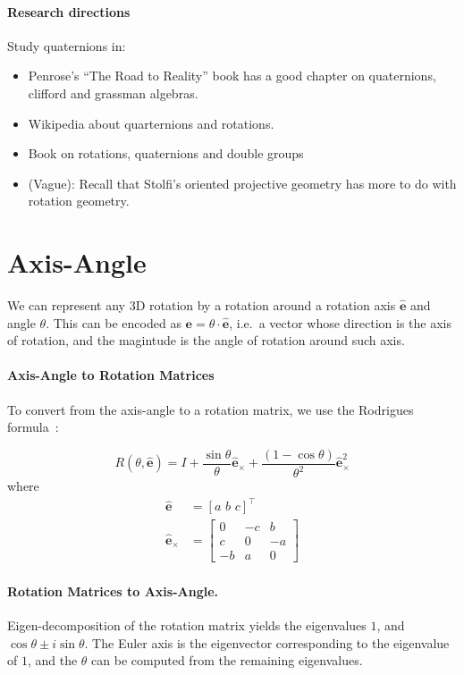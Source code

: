 \paragraph{Research directions}
Study quaternions in:
\begin{itemize}
\item Penrose's ``The Road to Reality'' book has a good chapter on quaternions,
clifford and grassman algebras.
\item Wikipedia about quarternions and rotations.
\item Book on rotations, quaternions and double groups
\item (Vague): Recall that Stolfi's oriented projective geometry has more to do with
rotation geometry.
\end{itemize}

\section{Axis-Angle}

We can represent any 3D rotation by a rotation around a rotation axis
$\hat{\mathbf e}$ and angle $\theta$. This can be encoded as $\mathbf e =
\theta\cdot\hat{\mathbf e}$, i.e.\ a vector whose direction is the axis of
rotation, and the magintude is the angle of rotation around such axis.

\paragraph{Axis-Angle to Rotation Matrices}

To convert from the axis-angle to a rotation matrix, we use the Rodrigues
formula~\cite{Ma:Soatto:etal:book}:

\begin{equation}\label{eq:rodrigues:rotation:formula}
R(\theta,\hat{\mathbf e}) = I + \frac{\sin\theta}{\theta} \hat{\mathbf e}_\times
+ \frac{(1 - \cos\theta)}{\theta^2}\hat{\mathbf e}_\times^2
\end{equation}
where
\begin{align}
\hat{\mathbf e} &= 
\left[ a\,\,b\,\,c \right]^\top\\
\hat{\mathbf e}_\times&= \left[\begin{array}{ccc} 0 & -c & b\\ c & 0 & -a\\ -b &
a & 0 \end{array} \right]
\end{align}

\paragraph{Rotation Matrices to Axis-Angle.}
Eigen-decomposition of the rotation matrix yields the eigenvalues $1$, and $\cos\theta \pm i\sin\theta$.
The Euler axis is the eigenvector corresponding to the eigenvalue of $1$, and the $\theta$ can be computed from the remaining eigenvalues.



